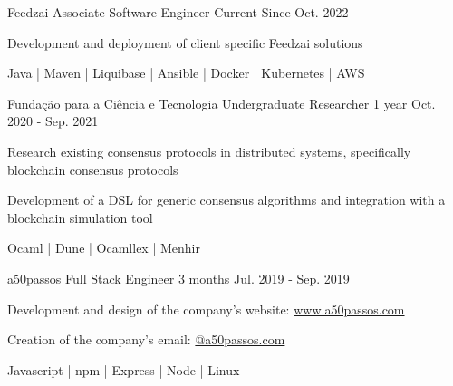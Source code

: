 


\begin{cventries}



\cventry
  {Feedzai} %
  {Associate Software Engineer} %
  {Current} %
  {Since Oct. 2022} %
  {
    \begin{cvitems}
      \item{Development and deployment of client specific Feedzai solutions}
    \end{cvitems}
  }
  {Java | Maven | Liquibase | Ansible | Docker | Kubernetes | AWS}

\cventry
  {Fundação para a Ciência e Tecnologia} %
  {Undergraduate Researcher} %
  {1 year} %
  {Oct. 2020 - Sep. 2021} %
  {
    \begin{cvitems}
      \item{Research existing consensus protocols in distributed systems, specifically blockchain consensus protocols}
      \item{Development of a DSL for generic consensus algorithms and integration with a blockchain simulation tool}
    \end{cvitems}
  }
  {Ocaml | Dune | Ocamllex | Menhir}

\cventry
  {a50passos} %
  {Full Stack Engineer} %
  {3 months} %
  {Jul. 2019 - Sep. 2019} %
  {
    \begin{cvitems}
      \item{Development and design of the company's website: \href{https://www.a50passos.com}{www.a50passos.com}}
      \item{Creation of the company's email: \href{mailto:geral@a50passos.com}{@a50passos.com}}
    \end{cvitems}
  }
  {Javascript | npm | Express | Node | Linux}

\end{cventries}
